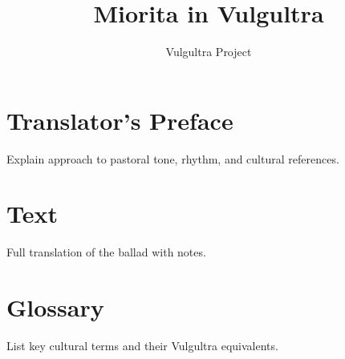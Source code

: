 \documentclass[12pt]{book}
\title{Miorita in Vulgultra}
\author{Vulgultra Project}
\date{}
\begin{document}
\maketitle
\tableofcontents

\chapter{Translator's Preface}
Explain approach to pastoral tone, rhythm, and cultural references.

\chapter{Text}
Full translation of the ballad with notes.

\chapter{Glossary}
List key cultural terms and their Vulgultra equivalents.
\end{document}
